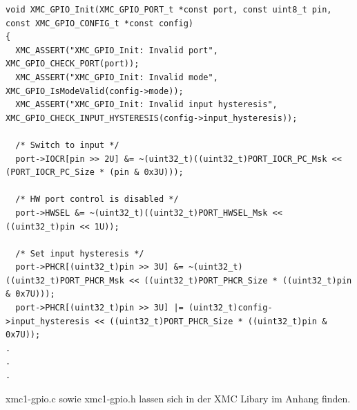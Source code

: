 \begin{minipage}{1\textwidth}
\begin{lstlisting}
void XMC_GPIO_Init(XMC_GPIO_PORT_t *const port, const uint8_t pin, const XMC_GPIO_CONFIG_t *const config)
{
  XMC_ASSERT("XMC_GPIO_Init: Invalid port", XMC_GPIO_CHECK_PORT(port));
  XMC_ASSERT("XMC_GPIO_Init: Invalid mode", XMC_GPIO_IsModeValid(config->mode));
  XMC_ASSERT("XMC_GPIO_Init: Invalid input hysteresis", XMC_GPIO_CHECK_INPUT_HYSTERESIS(config->input_hysteresis));
  
  /* Switch to input */
  port->IOCR[pin >> 2U] &= ~(uint32_t)((uint32_t)PORT_IOCR_PC_Msk << (PORT_IOCR_PC_Size * (pin & 0x3U)));

  /* HW port control is disabled */
  port->HWSEL &= ~(uint32_t)((uint32_t)PORT_HWSEL_Msk << ((uint32_t)pin << 1U));

  /* Set input hysteresis */
  port->PHCR[(uint32_t)pin >> 3U] &= ~(uint32_t)((uint32_t)PORT_PHCR_Msk << ((uint32_t)PORT_PHCR_Size * ((uint32_t)pin & 0x7U)));
  port->PHCR[(uint32_t)pin >> 3U] |= (uint32_t)config->input_hysteresis << ((uint32_t)PORT_PHCR_Size * ((uint32_t)pin & 0x7U));
.
.
.    
\end{lstlisting}
\label{fig:oAPI}
\end{minipage}

xmc1-gpio.c sowie xmc1-gpio.h lassen sich in der XMC Libary im Anhang finden.

